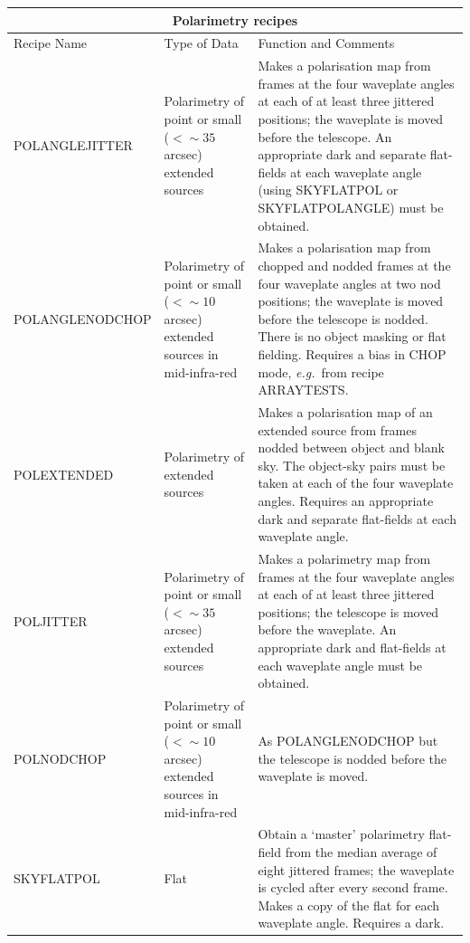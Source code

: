 \documentclass[twoside,11pt]{article}
\newcommand{\htmlref}[2]{#1}
\renewcommand{\_}{\texttt{\symbol{95}}}
\begin{document}
\begin{center}
\begin{tabular}{|l|p{29mm}|p{78mm}|}
\multicolumn{3}{c}{\large{\bf Polarimetry recipes}} \vspace*{1ex} \\
\hline
Recipe Name & Type of Data & Function and Comments \\ \hline
\htmlref{POL\_ANGLE\_JITTER}{POL\_ANGLE\_JITTER} & 
   Polarimetry of point or small ($<\sim35$ arcsec) extended sources &
   Makes a polarisation map from frames at the four waveplate angles at
   each of at least three jittered positions; the waveplate is moved
   before the telescope.  An appropriate dark and separate flat-fields
   at each waveplate angle (using SKY\_FLAT\_POL or SKY\_FLAT\_POL\_ANGLE)
   must be obtained. \\ \hline
\htmlref{POL\_ANGLE\_NOD\_CHOP}{POL\_ANGLE\_NOD\_CHOP} & 
   Polarimetry of point or small ($<\sim10$ arcsec) extended sources in
   mid-infra-red &
   Makes a polarisation map from chopped and nodded frames at the four
   waveplate angles at two nod positions; the waveplate is moved before
   the telescope is nodded.  There is no object masking or flat fielding.
   Requires a bias in CHOP mode, {\em e.g.}\ from recipe ARRAY\_TESTS. \\ \hline
\htmlref{POL\_EXTENDED}{POL\_EXTENDED} &
   Polarimetry of extended sources &
   Makes a polarisation map of an extended source from frames
   nodded between object and blank sky.  The object-sky pairs
   must be taken at each of the four waveplate angles.  Requires
   an appropriate dark and separate flat-fields at each waveplate
   angle. \\ \hline
\htmlref{POL\_JITTER}{POL\_JITTER} & 
   Polarimetry of point or small ($<\sim35$ arcsec) extended sources &
   Makes a polarimetry map from frames at the four waveplate angles at
   each of at least three jittered positions; the telescope is moved
   before the waveplate.  An appropriate dark and flat-fields at each
   waveplate angle must be obtained.\\ \hline
\htmlref{POL\_NOD\_CHOP}{POL\_NOD\_CHOP} & 
   Polarimetry of point or small ($<\sim10$ arcsec) extended sources in
   mid-infra-red &
   As \htmlref{POL\_ANGLE\_NOD\_CHOP}{POL\_ANGLE\_NOD\_CHOP} but
   the telescope is nodded before the waveplate is moved.  \\ \hline
\htmlref{SKY\_FLAT\_POL}{SKY\_FLAT\_POL} & Flat &
   Obtain a `master' polarimetry flat-field from the median average
   of eight jittered frames; the waveplate is cycled after
   every second frame.  Makes a copy of the flat for each
   waveplate angle.  Requires a dark.\\ \hline
\end{tabular}
\end{center}
\end{document}
